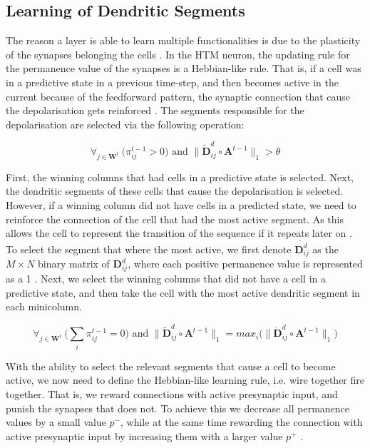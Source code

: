 \subsection{Learning of Dendritic Segments}
The reason a layer is able to learn multiple functionalities is due to the plasticity of the synapses belonging the cells \cite{10.3389/fncir.2016.00023}. In the HTM neuron, the updating rule for the permanence value of the synapses is a Hebbian-like rule. That is, if a cell was in a predictive state in a previous time-step, and then becomes active in the current because of the feedforward pattern, the synaptic connection that cause the depolarisation gets reinforced \cite{10.3389/fncir.2016.00023}. The segments responsible for the depolarisation are selected via the following operation:


\begin{equation}
    \label{eq:tm_predicted}
    \forall_{j\in\boldsymbol{W}^{t}}\ \Big( \pi^{t-1}_{ij} > 0 \Big) \text{ and } \Big\| \tilde{\boldsymbol{D}}^{d}_{ij} \circ \boldsymbol{A}^{t-1} \Big\|_1 > \theta
\end{equation}


First, the winning columns that had cells in a predictive state is selected. Next, the dendritic segments of these cells that cause the depolarisation is selected. However, if a winning column did not have cells in a predicted state, we need to reinforce the connection of the cell that had the most active segment. As this allows the cell to represent the transition of the sequence if it repeats later on \cite{10.3389/fncir.2016.00023}. To select the segment that where the most active, we first denote $\dot{\boldsymbol{D}^{d}_{ij}}$ as the $M \times N$ binary matrix of $\boldsymbol{D}^{d}_{ij}$, where each positive permanence value is represented as a 1 \cite{10.3389/fncir.2016.00023}. Next, we select the winning columns that did not have a cell in a predictive state, and then take the cell with the most active dendritic segment in each minicolumn.

\begin{equation}
    \label{eq:tm_close}
    \forall_{j\in\boldsymbol{W}^{t}}\ \Big( \sum_{i}\pi^{t-1}_{ij} = 0 \Big) \text{ and } \Big\| \tilde{\boldsymbol{D}}^{d}_{ij} \circ \boldsymbol{A}^{t-1} \Big\|_1 = max_i\Big(\Big\| \dot{\boldsymbol{D}}^{d}_{ij} \circ \boldsymbol{A}^{t-1} \Big\|_1 \Big)
\end{equation}


With the ability to select the relevant segments that cause a cell to become active, we now need to define the Hebbian-like learning rule, i.e. wire together fire together. That is, we reward connections with active presynaptic input, and punish the synapses that does not. To achieve this we decrease all permanence values by a small value $p^-$, while at the same time rewarding the connection with active presynaptic input by increasing them with a larger value $p^+$ \cite{10.3389/fncir.2016.00023}. 

